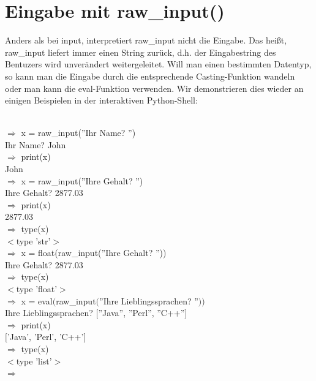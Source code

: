 \section{Eingabe mit raw\_input()}
Anders als bei input, interpretiert raw\_input nicht die Eingabe. Das heißt, raw\_input liefert immer einen String zurück, d.h. der Eingabestring des Bentuzers wird unverändert weitergeleitet. Will man einen bestimmten Datentyp, so kann man die Eingabe durch die entsprechende Casting-Funktion wandeln oder man kann die eval-Funktion verwenden. Wir demonstrieren dies wieder an einigen Beispielen in der interaktiven Python-Shell: \\
\\
\begin{MyConsoleBox}{
${\Longrightarrow}$ x = raw\_input(''Ihr Name? '') \\
Ihr Name? John \\
${\Longrightarrow}$ print(x) \\
John \\
${\Longrightarrow}$ x = raw\_input(''Ihre Gehalt? '') \\
Ihre Gehalt? 2877.03 \\
${\Longrightarrow}$ print(x) \\
2877.03 \\
${\Longrightarrow}$ type(x) \\
$<$type 'str'$>$ \\
${\Longrightarrow}$ x = float(raw\_input(''Ihre Gehalt? '')) \\
Ihre Gehalt? 2877.03 \\
${\Longrightarrow}$ type(x) \\
$<$type 'float'$>$ \\
${\Longrightarrow}$ x = eval$($raw\_input$($''Ihre Lieblingssprachen? ''$))$ \\
Ihre Lieblingssprachen?  $[$''Java'', ''Perl'', ''C++''$]$ \\
${\Longrightarrow}$ print(x) \\
$[$'Java', 'Perl', 'C++'$]$ \\
${\Longrightarrow}$ type(x) \\
$<$type 'list'$>$ \\
${\Longrightarrow}$ \\
}\end{MyConsoleBox}

